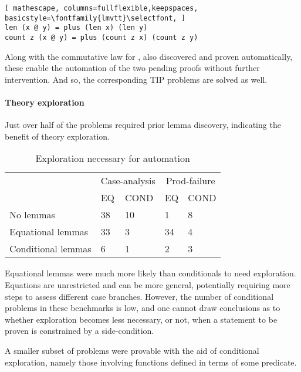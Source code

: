 \begin{lstlisting}[ mathescape, columns=fullflexible,keepspaces, basicstyle=\fontfamily{lmvtt}\selectfont, ]
len (x @ y) = plus (len x) (len y)
count z (x @ y) = plus (count z x) (count z y)
\end{lstlisting}

\noindent Along with the commutative law for , also discovered and proven automatically, these enable the automation of the two pending proofs without further intervention.
%
And so, the corresponding TIP problems are solved as well.



\paragraph{Theory exploration}

Just over half of the problems required prior lemma discovery, indicating the benefit of theory exploration.

\begin{table}
\begin{tabularx}{\textwidth}{l | X X | X X}
  & \multicolumn{2}{c|}{Case-analysis} & \multicolumn{2}{c}{Prod-failure} \\
  &  EQ & COND & EQ & COND \\
  \hline
  No lemmas & 38 & 10 & 1 & 8 \\
  Equational lemmas & 33 & 3 & 34 & 4 \\
  Conditional lemmas & 6 & 1 & 2 & 3 \\
\end{tabularx}
\caption{Exploration necessary for automation}
\label{tab:explore}
\end{table}

Equational lemmas were much more likely than conditionals to need exploration.
%
Equations are unrestricted and can be more general, potentially requiring more steps to assess different case branches.
%
However, the number of conditional problems in these benchmarks is low, and one cannot draw conclusions as to whether exploration becomes less necessary, or not, when a statement to be proven is constrained by a side-condition.%

A smaller subset of problems were provable with the aid of conditional exploration, namely those involving functions defined in terms of some predicate.

